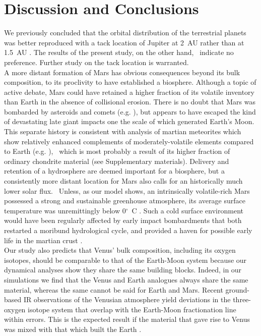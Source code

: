 \documentclass[preprint,5p,times,authoryear]{elsarticle}
\begin{document}
\section{Discussion and Conclusions}
We previously concluded that the orbital distribution of the terrestrial planets was better reproduced with a tack location of 
Jupiter at 2~AU rather than at 1.5~AU \citep{B16}. The results of the present study, on the other hand, {\ indicate no preference}. 
Further study on the tack location is warranted.\\

A more distant formation of Mars has obvious consequences beyond its bulk composition, to its proclivity to have established a 
biosphere. Although a topic of active debate, Mars could have retained a higher fraction of its volatile inventory than Earth 
\citep{K14} in the absence of collisional erosion. There is no doubt that Mars was bombarded by asteroids and comets 
(e.g. \cite{AM16}), but appears to have escaped the kind of devastating late giant impacts one the scale of which generated Earth's 
Moon. This separate history is consistent with analysis of martian meteorites which show relatively enhanced complements of 
moderately-volatile elements compared to Earth (e.g. \cite{AG13,W15}), {\ which is most probably a result of its higher fraction of 
ordinary chondrite material (see Supplementary materials).} Delivery and retention of a hydrosphere are deemed important for a 
biosphere, but a consistently more distant location for Mars also calls for an historically much lower solar flux. {\ Unless, as our 
model shows, an intrinsically volatile-rich Mars possessed a strong and sustainable greenhouse atmosphere, its average surface 
temperature was unremittingly below 0$^\circ$~C \citep{F13}}. Such a cold surface environment would have been regularly affected by 
early impact bombardments that both restarted a moribund hydrological cycle, and provided a haven for possible early life in the 
martian crust \citep{AM16}.\\

Our study also predicts that Venus' bulk composition, including its oxygen isotopes, should be comparable to that of the Earth-Moon 
system because our dynamical analyses show they share the same building blocks. Indeed, in our simulations we find that the 
Venus and Earth analogues always share the same material, whereas the same cannot be said for Earth and Mars. Recent 
ground-based IR observations of the Venusian atmosphere yield deviations in the three-oxygen isotope system that overlap with the 
Earth-Moon fractionation line within errors. This is the expected result if the material that gave rise to Venus was mixed with that 
which built the Earth \citep{I15}.\\
\end{document}
